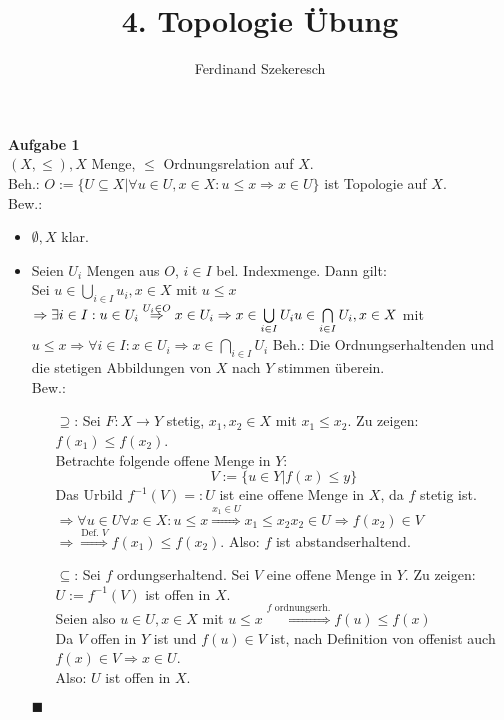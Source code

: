 \documentclass{article}
\title{4. Topologie Übung}
\author{Ferdinand Szekeresch}
\begin{document}
\maketitle

\textbf{Aufgabe 1}\\
$(X,\leq),X$ Menge, $\leq$ Ordnungsrelation auf $X$.\\
Beh.: $O:=\{U\subseteq X|\forall u\in U,x\in X:u\leq x \Rightarrow x\in U\}$ ist Topologie auf $X$.\\
Bew.: \begin{itemize}
\item $\emptyset, X$ klar.
\item Seien $U_i$ Mengen aus $O$, $i\in I$ bel. Indexmenge. Dann gilt:\\
Sei $u\in\bigcup\limits_{i\in I}u_i,x\in X$ mit $u\leq x$ $\Rightarrow\exists i\in I: u\in U_i\\
\stackrel{U_i\in O}{\Rightarrow}x\in U_i\Rightarrow x\in\bigcup\limits_{i\in I}U_i\\
u\in\bigcap\limits_{i\in I}U_i,x\in X$ mit $u\leq x\Rightarrow\forall i\in I:x\in U_i\Rightarrow x\in\bigcap\limits_{i\in I}U_i$
Beh.: Die Ordnungserhaltenden und die stetigen Abbildungen von $X$ nach $Y$ stimmen überein.\\
Bew.:\begin{itemize}\item[\glqq$\supseteq$\grqq:] Sei $F:X\rightarrow Y$ stetig, $x_1,x_2\in X$ mit $x_1\leq x_2$. Zu zeigen: $f(x_1)\leq f(x_2)$.\\
Betrachte folgende offene Menge in $Y$:
$$V:=\{u\in Y|f(x)\leq y\}$$
Das Urbild $f^{-1}(V)=:U$ ist eine offene Menge in $X$, da $f$ stetig ist.\\
$\Rightarrow\forall u\in U\forall x\in X: u\leq x\stackrel{x_1\in U}{\Rightarrow}{x_1\leq x_2}x_2\in U\Rightarrow f(x_2)\in V$\\
$\Rightarrow\stackrel{\text{Def. }V}{\Rightarrow}f(x_1)\leq f(x_2)$. Also: $f$ ist abstandserhaltend.
\item[\glqq$\subseteq$\grqq:] Sei $f$ ordungserhaltend. Sei $V$ eine offene Menge in $Y$. Zu zeigen: $U:=f^{-1}(V)$ ist offen in $X$.\\
Seien also $u\in U,x\in X$ mit $u\leq x\stackrel{f\text{ ordnungserh.}}{\Rightarrow}f(u)\leq f(x)$\\
Da $V$ offen in $Y$ ist und $f(u)\in V$ ist, nach Definition von \glqq offen\grqq ist auch $f(x)\in V\Rightarrow x\in U$.\\
Also: $U$ ist offen in $X$.\\
\end{itemize}
$\blacksquare$
\end{itemize}
\end{document}

